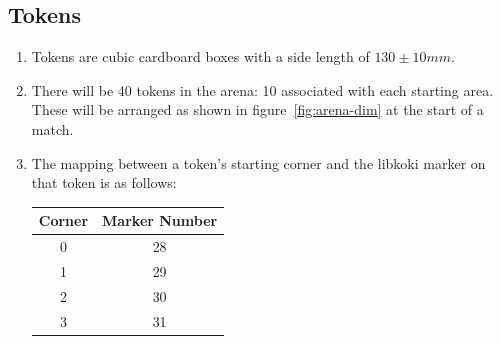 \subsection{Tokens}
\label{sub:Tokens}
\begin{enumerate}
\item Tokens are cubic cardboard boxes with a side length of $130 \pm 10 mm$.

\item There will be 40 tokens in the arena: 10 associated with each starting area.  These will be arranged as shown in figure~\ref{fig:arena-dim} at the start of a match.

\item The mapping between a token's starting corner and the libkoki marker on that token is as follows:

\begin{center}
  \begin{tabular}{cc}
    \toprule
    \textbf{Corner} & \textbf{Marker Number} \\
    \midrule
    0 & 28 \\
    1 & 29 \\
    2 & 30 \\
    3 & 31 \\
    \bottomrule
  \end{tabular}
\end{center}

\end{enumerate}

\clearpage
